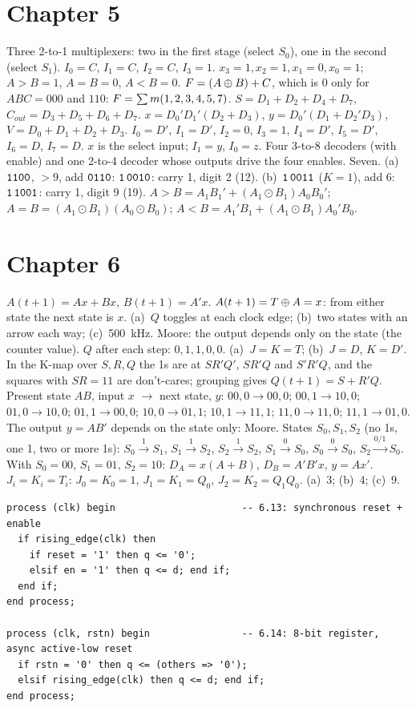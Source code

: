 \section*{Chapter 5}
 Three 2-to-1 multiplexers: two in the first stage (select $S_0$), one in the second (select $S_1$).
 $I_0=C$, $I_1=C$, $I_2=C$, $I_3=1$.
 $x_3=1,x_2=1,x_1=0,x_0=1$; $A>B=1$, $A=B=0$, $A<B=0$.
 $F=(A\oplus B)+C$, which is 0 only for $ABC=000$ and $110$: $F=\sum m(1,2,3,4,5,7)$.
 $S=D_1+D_2+D_4+D_7$, $C_{out}=D_3+D_5+D_6+D_7$.
 $x=D_0'D_1'(D_2+D_3)$, $y=D_0'(D_1+D_2'D_3)$, $V=D_0+D_1+D_2+D_3$.
 $I_0=D'$, $I_1=D'$, $I_2=0$, $I_3=1$, $I_4=D'$, $I_5=D'$, $I_6=D$, $I_7=D$.
 $x$ is the select input; $I_1=y$, $I_0=z$.
 Four 3-to-8 decoders (with enable) and one 2-to-4 decoder whose outputs drive the four enables.
 Seven.
 (a)~$\mathtt{1100}$, $>9$, add $\mathtt{0110}$: $\mathtt{1\,0010}$: carry 1, digit 2 (12). (b)~$\mathtt{1\,0011}$ ($K=1$), add 6: $\mathtt{1\,1001}$: carry 1, digit 9 (19).
 $A>B=A_1B_1'+(A_1\odot B_1)A_0B_0'$; $A=B=(A_1\odot B_1)(A_0\odot B_0)$; $A<B=A_1'B_1+(A_1\odot B_1)A_0'B_0$.
 
 

\section*{Chapter 6}
 $A(t+1)=Ax+Bx$, $B(t+1)=A'x$.
 $A(t+1)=T\oplus A=x$: from either state the next state is $x$.
 (a)~$Q$ toggles at each clock edge; (b)~two states with an arrow each way; (c)~500~kHz.
 Moore: the output depends only on the state (the counter value).
 $Q$ after each step: $0,1,1,0,0$.
 (a)~$J=K=T$; (b)~$J=D$, $K=D'$.
 In the K-map over $S,R,Q$ the 1s are at $SR'Q'$, $SR'Q$ and $S'R'Q$, and the squares with $SR=11$ are don't-cares; grouping gives $Q(t+1)=S+R'Q$.
 Present state $AB$, input $x$ $\to$ next state, $y$: $00,0\to00,0$; $00,1\to10,0$; $01,0\to10,0$; $01,1\to00,0$; $10,0\to01,1$; $10,1\to11,1$; $11,0\to11,0$; $11,1\to01,0$. The output $y=AB'$ depends on the state only: Moore.
 States $S_0,S_1,S_2$ (no 1s, one 1, two or more 1s): $S_0\xrightarrow{1}S_1$, $S_1\xrightarrow{1}S_2$, $S_2\xrightarrow{1}S_2$, $S_1\xrightarrow{0}S_0$, $S_0\xrightarrow{0}S_0$, $S_2\xrightarrow{0/1}S_0$. With $S_0=00$, $S_1=01$, $S_2=10$: $D_A=x(A+B)$, $D_B=A'B'x$, $y=Ax'$.
 $J_i=K_i=T_i$: $J_0=K_0=1$, $J_1=K_1=Q_0$, $J_2=K_2=Q_1Q_0$.
 (a)~3; (b)~4; (c)~9.
 \begin{lstlisting}
process (clk) begin                      -- 6.13: synchronous reset + enable
  if rising_edge(clk) then
    if reset = '1' then q <= '0';
    elsif en = '1' then q <= d; end if;
  end if;
end process;

process (clk, rstn) begin                -- 6.14: 8-bit register, async active-low reset
  if rstn = '0' then q <= (others => '0');
  elsif rising_edge(clk) then q <= d; end if;
end process;\end{lstlisting}

